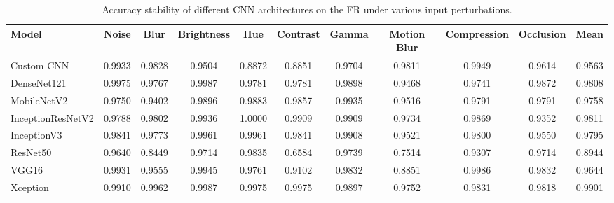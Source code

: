 \documentclass[a4paper,fleqn]{cas-dc}
\begin{document}
\begin{table}[t]
\centering
\caption{Accuracy stability of different CNN architectures on the FR under various input perturbations.}
\label{tab:accuracy_stability_flowers_recognition}

\scriptsize
\setlength{\tabcolsep}{3pt}
\renewcommand{\arraystretch}{1.1}

\begin{tabular}{|l|ccccccccc|c|}
\hline
\textbf{Model} &
\textbf{Noise} &
\textbf{Blur} &
\textbf{Brightness} &
\textbf{Hue} &
\textbf{Contrast} &
\textbf{Gamma} &
\textbf{Motion Blur} &
\textbf{Compression} &
\textbf{Occlusion} &
\textbf{Mean} \\
\hline

Custom CNN
&0.9933&0.9828&0.9504&0.8872&0.8851&0.9704&0.9811&0.9949&0.9614&0.9563\\

DenseNet121
&0.9975&0.9767&0.9987&0.9781&0.9781&0.9898&0.9468&0.9741&0.9872&0.9808\\

MobileNetV2
&0.9750&0.9402&0.9896&0.9883&0.9857&0.9935&0.9516&0.9791&0.9791&0.9758\\

InceptionResNetV2
&0.9788&0.9802&0.9936&1.0000&0.9909&0.9909&0.9734&0.9869&0.9352&0.9811\\

InceptionV3
&0.9841&0.9773&0.9961&0.9961&0.9841&0.9908&0.9521&0.9800&0.9550&0.9795\\

ResNet50
&0.9640&0.8449&0.9714&0.9835&0.6584&0.9739&0.7514&0.9307&0.9714&0.8944\\

VGG16
&0.9931&0.9555&0.9945&0.9761&0.9102&0.9832&0.8851&0.9986&0.9832&0.9644\\

Xception
&0.9910&0.9962&0.9987&0.9975&0.9975&0.9897&0.9752&0.9831&0.9818&0.9901\\

\hline
\end{tabular}
\end{table}
\end{document}
